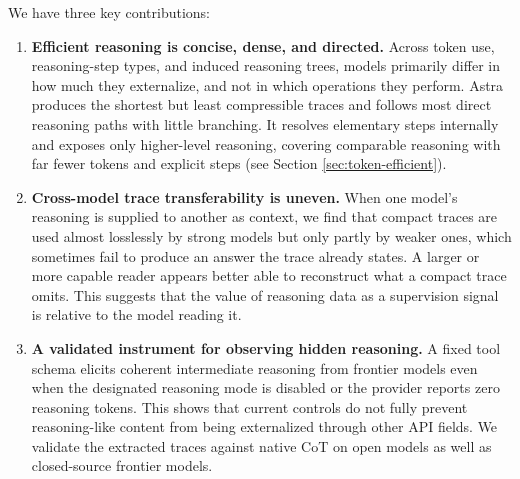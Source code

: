 \documentclass[10pt,letterpaper]{article}
\begin{document}
We have three key contributions:
\begin{enumerate}

    \item \textbf{Efficient reasoning is concise, dense, and directed.}
        Across token use, reasoning-step types, and induced reasoning trees, models primarily differ in how much they externalize, and not in which operations they perform. Astra produces the shortest but least compressible traces and follows most direct reasoning paths with little branching. It resolves elementary steps internally and exposes only higher-level reasoning, covering comparable reasoning with far fewer tokens and explicit steps (see Section \ref{sec:token-efficient}).

    \item \textbf{Cross-model trace transferability is uneven.}
       When one model's reasoning is supplied to another as context, we find that
    compact traces are used almost losslessly by strong models but only partly by
    weaker ones, which sometimes fail to produce an answer the trace already
    states.  A larger or more capable reader appears better able to reconstruct
    what a compact trace omits. This suggests that the value of reasoning data as a
    supervision signal is relative to the model reading it. 
    
    \item \textbf{A validated instrument for observing hidden reasoning.}
       A fixed tool schema elicits coherent intermediate reasoning from frontier models even when the designated reasoning mode is disabled or the provider reports zero reasoning tokens. This shows that current controls do not fully prevent reasoning-like content from being externalized through other API fields. We validate the extracted traces against native CoT on open models as well as closed-source frontier models.
\end{enumerate}
\end{document}
